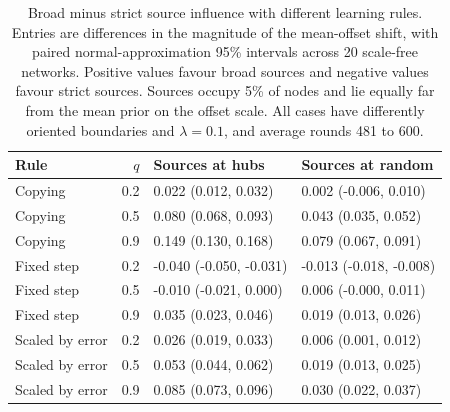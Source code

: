 \begin{table}[htbp]
\centering
\caption{Broad minus strict source influence with different learning rules. Entries are differences in the magnitude of the mean-offset shift, with paired normal-approximation 95\% intervals across 20 scale-free networks. Positive values favour broad sources and negative values favour strict sources. Sources occupy 5\% of nodes and lie equally far from the mean prior on the offset scale. All cases have differently oriented boundaries and $\lambda=0.1$, and average rounds 481 to 600.}
\label{tab:source_rules}
\begingroup\small\setlength{\tabcolsep}{4pt}
\begin{tabular}{lrll}
\toprule
Rule & $q$ & Sources at hubs & Sources at random \\
\midrule
Copying & 0.2 & 0.022 (0.012, 0.032) & 0.002 (-0.006, 0.010) \\
Copying & 0.5 & 0.080 (0.068, 0.093) & 0.043 (0.035, 0.052) \\
Copying & 0.9 & 0.149 (0.130, 0.168) & 0.079 (0.067, 0.091) \\
Fixed step & 0.2 & -0.040 (-0.050, -0.031) & -0.013 (-0.018, -0.008) \\
Fixed step & 0.5 & -0.010 (-0.021, 0.000) & 0.006 (-0.000, 0.011) \\
Fixed step & 0.9 & 0.035 (0.023, 0.046) & 0.019 (0.013, 0.026) \\
Scaled by error & 0.2 & 0.026 (0.019, 0.033) & 0.006 (0.001, 0.012) \\
Scaled by error & 0.5 & 0.053 (0.044, 0.062) & 0.019 (0.013, 0.025) \\
Scaled by error & 0.9 & 0.085 (0.073, 0.096) & 0.030 (0.022, 0.037) \\
\bottomrule
\end{tabular}\endgroup
\end{table}

\FloatBarrier
